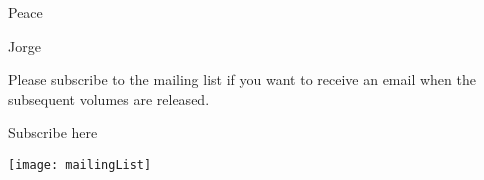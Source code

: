 \documentclass[600paper, 11pt,twoside,openany]{kdp}
\begin{document}
\par 
\vspace{-3pt}
\indent \par 
\vspace{-3pt}
\indent Peace
\par 
\vspace{-3pt}
\indent Jorge
\par 
\vspace{-3pt}
\indent Please subscribe to the mailing list if you want to receive an email when the subsequent volumes are released.


\begin{minipage}{0.5\textwidth}\raggedleft
Subscribe here
\end{minipage}
\begin{minipage}{0.8\textwidth}
\texttt{[image: mailingList]}
\end{minipage}
\end{document}
